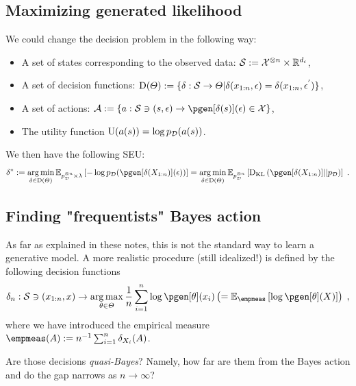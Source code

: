 \subsection{Maximizing generated likelihood}
We could change the decision problem in the following way:
\begin{itemize}
    \item A set of states corresponding to the observed data: $\mathcal{S} := {\mathcal{X}}^{\otimes n} \times \mathbb{R}^{d_{\epsilon}}$,
    \item A set of decision functions: $\mathrm{D}(\varTheta) := \{\delta: \mathcal{S} \rightarrow \varTheta | \delta({x}_{1:n},\epsilon) = \delta({x}_{1:n},{\epsilon}^{'})\}$,
    \item A set of actions: $\actionset \eqdef \{a: \stateset \ni (s, \epsilon) \rightarrow \pgen[\decfun(s)](\epsilon) \in  \xsp \}$,
    \item The utility function $\mathrm{U}(a(s)) = \log p_{\mathcal{D}}(a(s))$.
\end{itemize}
We then have the following SEU:
\begin{equation}
    \label{eq:genlik_seu}
    \tmin{\decfun} \eqdef \argmin_{\decfun \in \decfunset{\paramset}} \PE{\pdata^{\tensprod n} \times \gendist}{-\log \pdata(\pgen[\decfun(\chunk{\state}{1}{\ndata})](\epsilon))} = \argmin_{\decfun \in \decfunset{\paramset}} \PE{\pdata^{ \tensprod \ndata}}{\kl{\pgen[\decfun(\chunk{\state}{1}{\ndata})]}{\pdata}}\eqsp.
\end{equation}

\subsection{Finding "frequentists" Bayes action}

As far as explained in these notes, this is not the standard way to learn a generative model. 
A more realistic procedure (still idealized!) is defined by the following decision functions
\begin{equation*}
    \decfun_n: \stateset \ni (\chunk{\lstate}{1}{n}, \lstate) \rightarrow \argmax_{\param \in \paramset} \frac{1}{n} \sum_{i=1}^{n}\log \pgen[\param](\lstate_i)  \left(= \PE{\empmeas}{\log \pgen[\param](\state)}\right)\eqsp,
\end{equation*}
where we have introduced the empirical measure $\empmeas(A) \eqdef \ndata^{-1}\sum_{i=1}^{\ndata} \dirac{\state_i}(A)$.

Are those decisions \textit{quasi-Bayes}?  Namely, how far are them from the Bayes action and do the gap narrows as $n \rightarrow \infty$?

